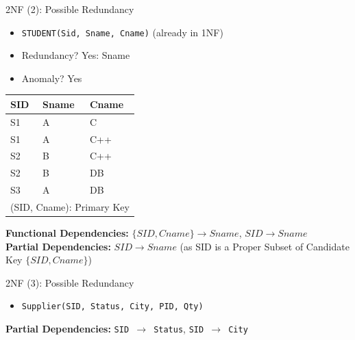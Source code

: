 \documentclass[aspectratio=169, xcolor=dvipsnames]{beamer}
\begin{document}
\begin{frame}{2NF (2): Possible Redundancy}
    \begin{itemize}
        \item \texttt{STUDENT(Sid, Sname, Cname)} (already in 1NF)
        \item Redundancy? Yes: Sname
        \item Anomaly? Yes
    \end{itemize}
    \begin{table}
    \centering
    \begin{tabular}{lll}
    \toprule
    \textbf{SID} & \textbf{Sname} & \textbf{Cname} \\
    \midrule
    S1 & A & C \\
    S1 & A & C++ \\
    S2 & B & C++ \\
    S2 & B & DB \\
    S3 & A & DB \\
    \bottomrule
    \multicolumn{3}{l}{\footnotesize (SID, Cname): Primary Key}
    \end{tabular}
    \end{table}
    \textbf{Functional Dependencies:} $\{SID, Cname\} \rightarrow Sname$, $SID \rightarrow Sname$ \\
    \textbf{Partial Dependencies:} $SID \rightarrow Sname$ (as SID is a Proper Subset of Candidate Key $\{SID, Cname\}$)
\end{frame}

\begin{frame}{2NF (3): Possible Redundancy}
    \begin{itemize}
        \item \texttt{Supplier(SID, Status, City, PID, Qty)}
    \end{itemize}
    \begin{table}
    \centering
    \end{table}
    \textbf{Partial Dependencies:} \texttt{SID $\rightarrow$ Status}, \texttt{SID $\rightarrow$ City}
\end{frame}
\end{document}
